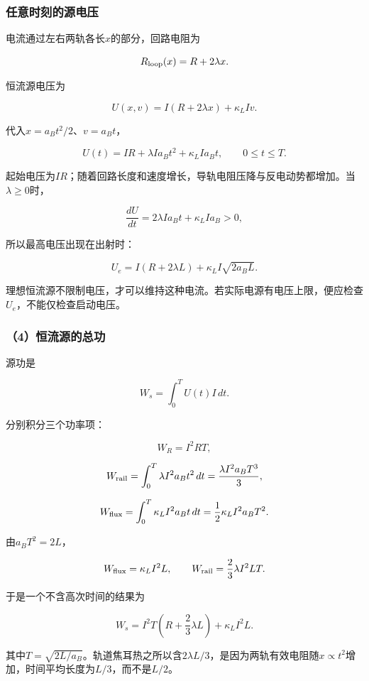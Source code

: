 \documentclass[12pt,a4paper,fontset=fandol]{ctexart}
\begin{document}
\subsubsection{任意时刻的源电压}\label{ux4efbux610fux65f6ux523bux7684ux6e90ux7535ux538b}

电流通过左右两轨各长\(x\)的部分，回路电阻为

\[
R_{\rm loop}(x)=R+2\lambda x.
\]

恒流源电压为

\[
\boxed{U(x,v)=I(R+2\lambda x)+\kappa_LIv}.
\]

代入\(x=a_Bt^2/2\)、\(v=a_Bt\)，

\[
\boxed{U(t)=IR+\lambda Ia_Bt^2+\kappa_LIa_Bt},
\qquad 0\le t\le T.
\]

起始电压为\(IR\)；随着回路长度和速度增长，导轨电阻压降与反电动势都增加。当\(\lambda\ge0\)时，

\[
\frac{dU}{dt}=2\lambda Ia_Bt+\kappa_LIa_B>0,
\]

所以最高电压出现在出射时：

\[
\boxed{
U_e=I(R+2\lambda L)+\kappa_LI\sqrt{2a_BL}}.
\]

理想恒流源不限制电压，才可以维持这种电流。若实际电源有电压上限，便应检查\(U_e\)，不能仅检查启动电压。

\subsubsection{（4）恒流源的总功}\label{ux6052ux6d41ux6e90ux7684ux603bux529f}

源功是

\[
W_s=\int_0^T U(t)I\,dt.
\]

分别积分三个功率项：

\[
W_R=I^2RT,
\]

\[
W_{\rm rail}=
\int_0^T\lambda I^2a_Bt^2\,dt
=\frac{\lambda I^2a_BT^3}{3},
\]

\[
W_{\rm flux}=
\int_0^T\kappa_LI^2a_Bt\,dt
=\frac12\kappa_LI^2a_BT^2.
\]

由\(a_BT^2=2L\)，

\[
W_{\rm flux}=\kappa_LI^2L,
\qquad
W_{\rm rail}=\frac23\lambda I^2LT.
\]

于是一个不含高次时间的结果为

\[
\boxed{
W_s=I^2T\left(R+\frac23\lambda L\right)
+\kappa_LI^2L}.
\]

其中\(T=\sqrt{2L/a_B}\)。轨道焦耳热之所以含\(2\lambda L/3\)，是因为两轨有效电阻随\(x\propto t^2\)增加，时间平均长度为\(L/3\)，而不是\(L/2\)。
\end{document}
